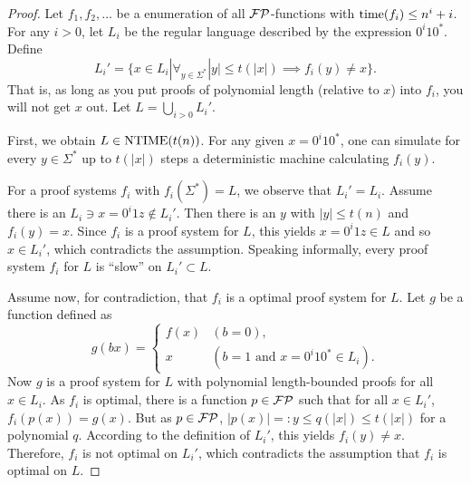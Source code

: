   \begin{proof}
    Let \(f_1, f_2, ...\) be a enumeration of all \(\mathcal{FP}\)-functions with \(\operatorname{time}(f_i) \leq n^i + i\). 
    For any \(i > 0\), let \(L_i\) be the regular language described by the expression \(0^i10^*\). Define
      \[ L_i' = \{ x \in L_i | \forall_{ y \in \Sigma^* } |y| \leq t(|x|) \implies f_i(y) \neq x \}. \]
    That is, as long as you put proofs of polynomial length (relative to \(x\)) into \(f_i\), you will not get \(x\) out.
    Let \(L = \bigcup_{i > 0} L_i'\).

    First, we obtain \(L \in \text{NTIME}(t(n))\). For any given \(x = 0^i10^*\), one can simulate for every \(y \in \Sigma^*\) up to \(t(|x|)\) steps a deterministic machine calculating \(f_i(y)\).

    For a proof systems \(f_i\) with \(f_i(\Sigma^*) = L\), we observe that \(L_i' = L_i\). Assume there is an \(L_i \ni x = 0^i1z \notin L_i'\). Then there is an \(y\) with \(|y| \leq t(n)\) and \(f_i(y) = x\). Since \(f_i\) is a proof system for \(L\), this yields \(x = 0^i1z \in L\) and so \(x \in L_i'\), which contradicts the assumption. Speaking informally, every proof system \(f_i\) for \(L\) is ``slow'' on \(L_i' \subset L\).

    Assume now, for contradiction, that \(f_i\) is a optimal proof system for \(L\). Let \(g\) be a function defined as
      \[ g(bx) = \begin{cases}
                  f(x) & (b = 0), \\
                  x & (b = 1 \text{ and } x = 0^i10^* \in L_i).
                 \end{cases} \]
    Now \(g\) is a proof system for \(L\) with polynomial length-bounded proofs for all \(x \in L_i\). As \(f_i\) is optimal, there is a function \(p \in \mathcal{FP}\) such that for all \(x \in L_i'\), \(f_i(p(x)) = g(x)\). But as \(p \in \mathcal{FP}\), \(|p(x)| =: y \leq q(|x|) \leq t(|x|)\) for a polynomial \(q\). According to the definition of \(L_i'\), this yields \(f_i(y) \neq x\). Therefore, \(f_i\) is not optimal on \(L_i'\), which contradicts the assumption that \(f_i\) is optimal on \(L\).
  \end{proof}


